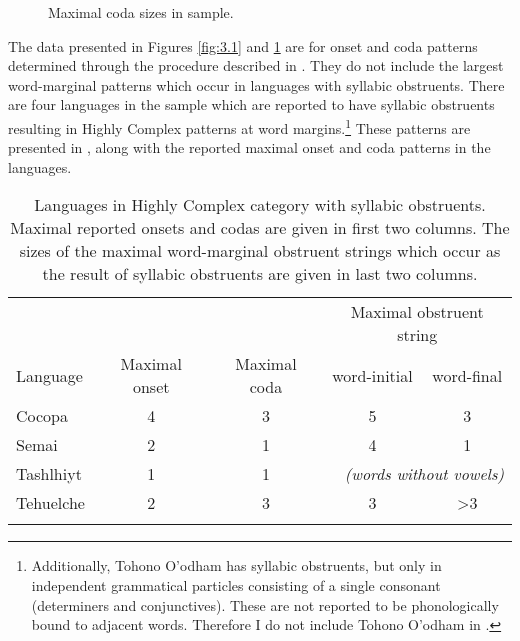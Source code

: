\begin{figure}
\caption{\label{fig:3.2}Maximal coda sizes in sample.}
\end{figure}

  The data presented in Figures \ref{fig:3.1} and \ref{fig:3.2} are for onset and coda patterns determined through the procedure described in . They do not include the largest word-marginal patterns which occur in languages with syllabic obstruents. There are four languages in the sample which are reported to have syllabic obstruents resulting in Highly Complex patterns at word margins.\footnote{{Additionally, Tohono O’odham has syllabic obstruents, but only in independent grammatical particles consisting of a single consonant (determiners and conjunctives). These are not reported to be phonologically bound to adjacent words. Therefore I do not include Tohono O’odham in .}} These patterns are presented in , along with the reported maximal onset and coda patterns in the languages.

\begin{table}
\begin{tabular}{lcccc}
\lsptoprule
           &                 &                & \multicolumn{2}{c}{Maximal obstruent string}\\\cmidrule(lr){4-5}
{Language} & {Maximal onset} & {Maximal coda} & word-initial & word-final\\\midrule
Cocopa & 4 & 3 & 5 & \phantom{>}3\\
Semai & 2 & 1 & 4 & \phantom{>}1\\
Tashlhiyt & 1 & 1 & \multicolumn{2}{r}{\textit{(words without vowels)}}\\
Tehuelche & 2 & 3 & 3 & >3\\
\lspbottomrule
\end{tabular}
\caption{\label{tab:3.1}Languages in Highly Complex category with syllabic obstruents. Maximal reported onsets and codas are given in first two columns. The sizes of the maximal word-marginal obstruent strings which occur as the result of syllabic obstruents are given in last two columns.}
\end{table}

